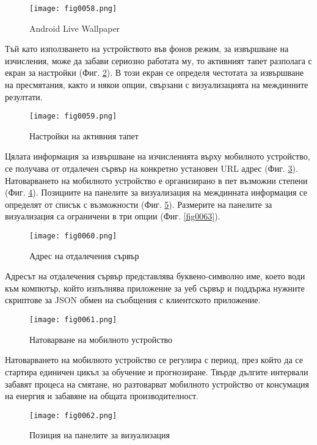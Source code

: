 \begin{figure}[H]
  \centering
  \texttt{[image: fig0058.png]}
  \caption{Android Live Wallpaper}
\label{fig0058}
\end{figure}

Тъй като използването на устройството във фонов режим, за извършване на изчисления, може да забави сериозно работата му, то активният тапет разполага с екран за настройки (Фиг. \ref{fig0059}). В този екран се определя честотата за извършване на пресмятания, както и някои опции, свързани с визуализацията на междинните резултати. 

\begin{figure}[H]
  \centering
  \texttt{[image: fig0059.png]}
  \caption{Настройки на активния тапет}
\label{fig0059}
\end{figure}

Цялата информация за извършване на изчисленията върху мобилното устройство, се получава от отдалечен сървър на конкретно установен URL адрес (Фиг. \ref{fig0060}). Натоварването на мобилното устройство е организирано в пет възможни степени (Фиг. \ref{fig0061}). Позициите на панелите за визуализация на междинната информация се определят от списък с възможности (Фиг. \ref{fig0062}). Размерите на панелите за визуализация са ограничени в три опции (Фиг. \ref{fig0063}).

\begin{figure}[H]
  \centering
  \texttt{[image: fig0060.png]}
  \caption{Адрес на отдалечения сървър}
\label{fig0060}
\end{figure}

Адресът на отдалечения сървър представлява буквено-символно име, което води към компютър, който изпълнява приложение за уеб сървър и поддържа нужните скриптове за JSON обмен на съобщения с клиентското приложение.

\begin{figure}[H]
  \centering
  \texttt{[image: fig0061.png]}
  \caption{Натоварване на мобилното устройство}
\label{fig0061}
\end{figure}

Натоварването на мобилното устройство се регулира с период, през който да се стартира единичен цикъл за обучение и прогнозиране. Твърде дългите интервали забавят процеса на смятане, но разтоварват мобилното устройство от консумация на енергия и забавяне на общата производителност.

\begin{figure}[H]
  \centering
  \texttt{[image: fig0062.png]}
  \caption{Позиция на панелите за визуализация}
\label{fig0062}
\end{figure}

